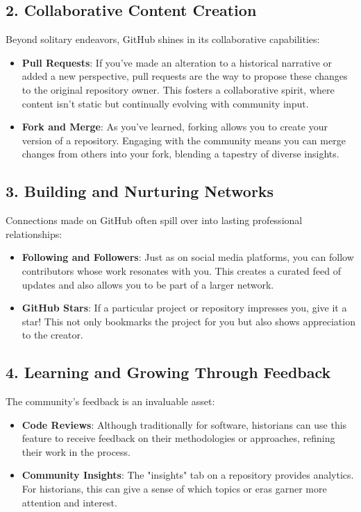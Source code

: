 \documentclass[a4paper,12pt]{book}
\begin{document}
\subsection*{2. Collaborative Content Creation}
Beyond solitary endeavors, GitHub shines in its collaborative capabilities:

\begin{itemize}
    \item \textbf{Pull Requests}: If you've made an alteration to a historical narrative or added a new perspective, pull requests are the way to propose these changes to the original repository owner. This fosters a collaborative spirit, where content isn't static but continually evolving with community input.
    \item \textbf{Fork and Merge}: As you've learned, forking allows you to create your version of a repository. Engaging with the community means you can merge changes from others into your fork, blending a tapestry of diverse insights.
\end{itemize}

\subsection*{3. Building and Nurturing Networks}
Connections made on GitHub often spill over into lasting professional relationships:

\begin{itemize}
    \item \textbf{Following and Followers}: Just as on social media platforms, you can follow contributors whose work resonates with you. This creates a curated feed of updates and also allows you to be part of a larger network.
    \item \textbf{GitHub Stars}: If a particular project or repository impresses you, give it a star! This not only bookmarks the project for you but also shows appreciation to the creator.
\end{itemize}

\subsection*{4. Learning and Growing Through Feedback}
The community's feedback is an invaluable asset:

\begin{itemize}
    \item \textbf{Code Reviews}: Although traditionally for software, historians can use this feature to receive feedback on their methodologies or approaches, refining their work in the process.
    \item \textbf{Community Insights}: The "insights" tab on a repository provides analytics. For historians, this can give a sense of which topics or eras garner more attention and interest.
\end{itemize}
\end{document}
